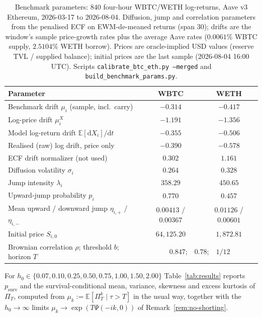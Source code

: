\documentclass[11pt]{article}
\newcommand{\E}{\mathbb{E}}
\newcommand{\diff}{\mathrm{d}}
\theoremstyle{plain}
\theoremstyle{definition}
\theoremstyle{remark}
\begin{document}
\begin{table}[ht]
\centering\small
\renewcommand{\arraystretch}{1.15}
\begin{tabular}{lcc}
\toprule
Parameter & WBTC & WETH \\
\midrule
Benchmark drift $\mu_i$ (sample, incl.\ carry) & $-0.314$ & $-0.417$ \\
Log-price drift $\mu_i^X$ & $-1.191$ & $-1.356$ \\
Model log-return drift $\E[\diff X_i]/\diff t$ & $-0.355$ & $-0.506$ \\
Realised (raw) log drift, price only & $-0.390$ & $-0.578$ \\
ECF drift normalizer (not used) & $0.302$ & $1.161$ \\
Diffusion volatility $\sigma_i$ & $0.264$ & $0.328$ \\
Jump intensity $\lambda_i$ & $358.29$ & $450.65$ \\
Upward-jump probability $p_i$ & $0.770$ & $0.457$ \\
Mean upward / downward jump $\eta_{i,+}$ / $\eta_{i,-}$ & $0.00413$ / $0.00367$ & $0.01126$ / $0.00601$ \\
Initial price $S_{i,0}$ & $64{,}125.20$ & $1{,}872.81$ \\
\midrule
Brownian correlation $\rho$; threshold $b$; horizon $T$ & \multicolumn{2}{c}{$0.847$;\ \ $0.78$;\ \ $1/12$} \\
\bottomrule
\end{tabular}
\caption{Benchmark parameters: $840$ four-hour WBTC/WETH log-returns, Aave v3 Ethereum,
2026-03-17 to 2026-08-04. Diffusion, jump and correlation parameters from the penalised ECF on
EWM-de-meaned returns (span 30); drifts are the window's sample price-growth rates plus the average
Aave rates ($0.0061\%$ WBTC supply, $2.5104\%$ WETH borrow). Prices are oracle-implied USD values
(reserve TVL / supplied balance); initial prices are the last sample (2026-08-04 16:00 UTC). Scripts
\texttt{calibrate\_btc\_eth.py --merged} and \texttt{build\_benchmark\_params.py}.}
\label{tab:num-params}
\end{table}

For $h_0\in\{0.07,0.10,0.25,0.50,0.75,1.00,1.50,2.00\}$ Table~\ref{tab:results} reports
$p_{\mathrm{surv}}$ and the survival-conditional mean, variance, skewness and excess kurtosis of
$\Pi_T$, computed from $\mu_k:=\E[\Pi_T^k\mid\tau>T]$ in the usual way, together with the
$h_0\to\infty$ limits $\mu_k\to\exp(T\Psi(-ik,0))$ of Remark~\ref{rem:no-shorting}.
\end{document}

